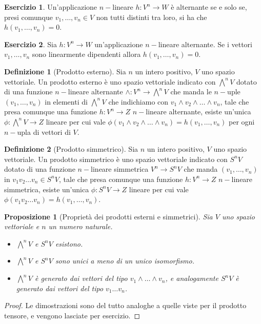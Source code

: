 \documentclass[11pt]{article}
\theoremstyle{plain}
\newtheorem{prop}[thm]{Proposizione}
\theoremstyle{definition}
\newtheorem{defn}{Definizione}[section]
\newtheorem{exercise}{Esercizio}[section]
\theoremstyle{remark}
\begin{document}
\begin{exercise}
  Un'applicazione $n-$lineare $h: V^n \to W$ è alternante se e solo se, presi comunque $v_1,\dots,v_n\in V$
  non tutti distinti tra loro, si ha che $h(v_1,\dots,v_n)=0$.
\end{exercise}

\begin{exercise}
  Sia $h: V^n \to W$ un'applicazione $n-$lineare alternante. Se i vettori $v_1,\dots,v_n$ sono linearmente dipendenti allora
  $h(v_1,\dots,v_n)=0$.
\end{exercise}


\begin{defn}[Prodotto esterno]
Sia $n$ un intero positivo, $V$ uno spazio vettoriale. Un prodotto esterno è uno spazio vettoriale indicato con $\bigwedge^n V$
dotato di una funzione $n-$lineare alternante $\wedge: V^n \to \bigwedge^n V$ che manda le $n-$uple $(v_1,\ldots,v_n)$ in
elementi di $\bigwedge^n V$ che indichiamo con $v_1\wedge v_2\wedge\ldots\wedge v_n$,
tale che presa comunque una funzione $h: V^n \to Z$ $n-$lineare alternante,
esiste un'unica $\phi: \bigwedge^n V \to Z $ lineare per cui vale $\phi(v_1\wedge v_2\wedge \ldots \wedge v_n)=h(v_1,\ldots,v_n)$
per ogni $n-$upla di vettori di $V$.
\label{defn:prodotto esterno}
\end{defn}

\begin{defn}[Prodotto simmetrico]
Sia $n$ un intero positivo, $V$ uno spazio vettoriale. Un prodotto simmetrico è uno spazio vettoriale indicato con $S^n V$
dotato di una funzione $n-$lineare simmetrica $V^n \to S^n V$ che manda $(v_1,\ldots,v_n)$ in
$v_1 v_2\ldots v_n \in S^n V$, tale che presa comunque una funzione $h: V^n \to Z$ $n-$lineare simmetrica,
esiste un'unica $\phi: S^n V \to Z $ lineare per cui vale $\phi(v_1 v_2 \ldots v_n)=h(v_1,\ldots,v_n)$.
\label{defn:prodotto simmetrico}
\end{defn}


\begin{prop}[Proprietà dei prodotti esterni e simmetrici]
Sia $V$ uno spazio vettoriale e $n$ un numero naturale.
\begin{itemize}
\item $\bigwedge^nV$ e $S^nV$ esistono.
\item $\bigwedge^nV$ e $S^nV$ sono unici a meno di un unico isomorfismo.
\item $\bigwedge^nV$ è generato dai vettori del tipo $v_1\wedge \dots \wedge v_n$, e analogamente
      $S^nV$ è generato dai vettori del tipo $v_1\dots v_n$.
\end{itemize}
\end{prop}
\begin{proof}
Le dimostrazioni sono del tutto analoghe a quelle viste per il prodotto tensore, e vengono lasciate per esercizio.
\end{proof}
\end{document}
